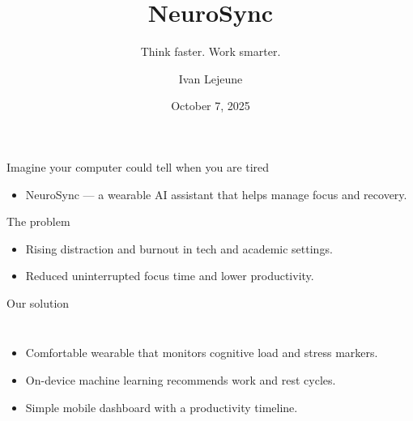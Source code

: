 \documentclass[10pt]{beamer}
\title{NeuroSync}
\subtitle{Think faster. Work smarter.}
\author{Ivan Lejeune}
\date{October 7, 2025}
\begin{document}
\begin{frame}
    \titlepage{}
\end{frame}

\begin{frame}{Imagine your computer could tell when you are tired}
    \vspace{0.3cm}
    \begin{itemize}
        \item NeuroSync --- a wearable AI assistant that helps manage focus and recovery.
    \end{itemize}
\end{frame}

\begin{frame}{The problem}
    \begin{itemize}
        \item Rising distraction and burnout in tech and academic settings.
        \item Reduced uninterrupted focus time and lower productivity.
    \end{itemize}
    \vfill
\end{frame}

\begin{frame}{Our solution}
    \begin{columns}
        \begin{itemize}
            \item Comfortable wearable that monitors cognitive load and stress markers.
            \item On-device machine learning recommends work and rest cycles.
            \item Simple mobile dashboard with a productivity timeline.
        \end{itemize}
    \end{columns}
\end{frame}
\end{document}

